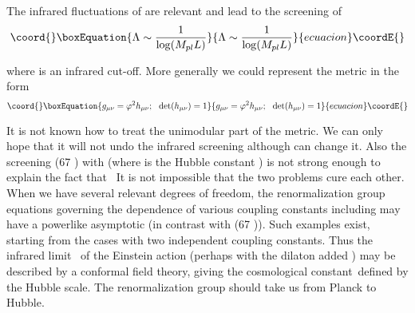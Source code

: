 \documentclass[a4paper,12pt]{article}
\begin{document}
The infrared fluctuations of \myHighlight{$\varphi $}\coordHE{} are relevant and lead to the
screening of \coordHE{}%
\begin{equation}\coord{}\boxEquation{
\Lambda \sim \frac{1}{\log (M_{pl}L)}
}{
\Lambda \sim \frac{1}{\log (M_{pl}L)}
}{ecuacion}\coordE{}\end{equation}

where \coordHE{} is an infrared cut-off. More generally we could represent the
metric in the form 
\begin{equation}\coord{}\boxEquation{
g_{\mu \nu }=\varphi ^{2}h_{\mu \nu };\ \ \det (h_{\mu \nu })=1
}{
g_{\mu \nu }=\varphi ^{2}h_{\mu \nu };\ \ \det (h_{\mu \nu })=1
}{ecuacion}\coordE{}\end{equation}

It is not known how to treat the unimodular part of the metric. We can only
hope that it will not undo the infrared screening although can change it.
Also the screening (67 ) with \coordHE{} (where \coordHE{} is the Hubble
constant ) is not strong enough to explain the fact that \coordHE{} \ It is not impossible that the two problems cure each other. When we have
several relevant degrees of freedom, the renormalization group equations
governing the \coordHE{} dependence of various coupling constants including \myHighlight{$%
\Lambda $}\coordHE{} may have a powerlike asymptotic (in contrast with (67 )). Such
examples exist, starting from the cases with two independent coupling
constants. Thus the infrared limit \ of the Einstein action (perhaps with
the dilaton added ) may be described by a conformal field theory, giving the
cosmological constant\ defined by the Hubble scale. The renormalization
group should take us from Planck to Hubble.
\end{document}
